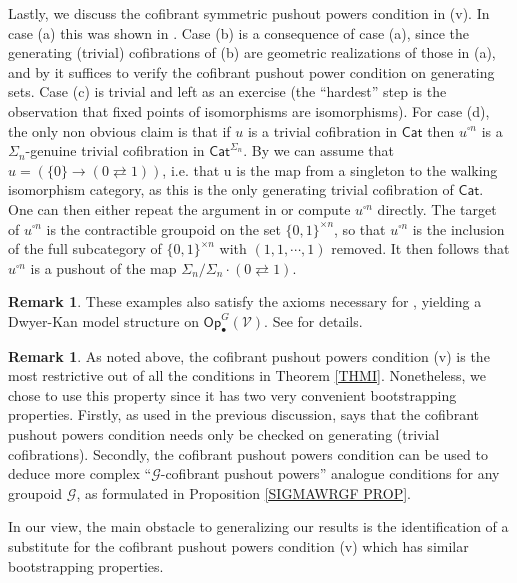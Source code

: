 \documentclass[a4paper,10pt
,draft
]{article}%
\numberwithin{equation}{section}
\numberwithin{figure}{section}
\theoremstyle{definition} %
\newtheorem{remark}[equation]{Remark}%
\newcommand{\Op}{\mathsf{Op}}%
\newcommand{\V}{\ensuremath{\mathcal V}}
\newcommand{\G}{\ensuremath{\mathcal G}}
\newcommand{\1}{\ensuremath{\mathbbm 1}}%
\begin{document}
Lastly, we discuss the cofibrant symmetric pushout powers condition in (v).
In case (a) this was shown in 
\cite[Ex. 6.19]{BP_geo}.
Case (b) is a consequence of case (a), 
since the generating (trivial) cofibrations of (b) are geometric realizations of those in (a),
and by \cite[Rmk. 6.17]{BP_geo}
it suffices to verify the cofibrant pushout power condition
on generating sets.
Case (c) is trivial and left as an exercise 
(the ``hardest'' step is the observation that fixed points of isomorphisms are isomorphisms).
For case (d), the only non obvious claim is that
if $u$ is a trivial cofibration in $\mathsf{Cat}$
then $u^{\square n}$
is a $\Sigma_n$-genuine trivial cofibration in $\mathsf{Cat}^{\Sigma_n}$.
By \cite[Rmk. 6.17]{BP_geo}
we can assume that $u = \left(\{0\} \to (0\rightleftarrows 1)\right)$,
i.e. that u is the map from a singleton to the walking isomorphism category,
as this is the only generating trivial cofibration of 
$\mathsf{Cat}$.
One can then either repeat the argument in \cite[Ex. 6.19]{BP_geo}
or compute $u^{\square n}$ directly.
The target of $u^{\square n}$
is the contractible groupoid on the set $\{0,1\}^{\times n}$,
so that $u^{\square n}$
is the inclusion of the full subcategory of 
$\{0,1\}^{\times n}$
with $(1,1,\cdots,1)$ removed.
It then follows that $u^{\square n}$
is a pushout of the map
$\Sigma_n/\Sigma_n \cdot (0 \rightleftarrows 1)$.

\begin{remark}
        These examples also satisfy the axioms necessary for \cite[Thm. \ref{AC-THMA}]{BP_ACOP},
        yielding a Dwyer-Kan model structure on $\Op_\bullet^G(\V)$.
        See \cite[\textcolor{red}{\S 1.2}]{BP_ACOP} for details.
\end{remark}


\begin{remark}\label{CPPWHY REM}
	As noted above, the cofibrant pushout powers
	condition (v) is the most restrictive 
	out of all the conditions in 
	Theorem \ref{THMI}. %
	Nonetheless, we chose to use this property 
	since it has two very convenient bootstrapping properties.
	Firstly, as used in the previous discussion, \cite[Rmk. 6.17]{BP_geo}
	says that the cofibrant pushout powers condition needs only be checked on generating (trivial cofibrations).
	Secondly, the cofibrant pushout powers condition 
	can be used to deduce more complex
	``$\G$-cofibrant pushout powers'' analogue conditions for any groupoid $\G$,
	as formulated in Proposition \ref{SIGMAWRGF PROP}.
	
	In our view, the main obstacle to generalizing our results is the identification of 
	a substitute for the cofibrant pushout powers condition (v)
	which has similar bootstrapping properties.
\end{remark}
\end{document}
